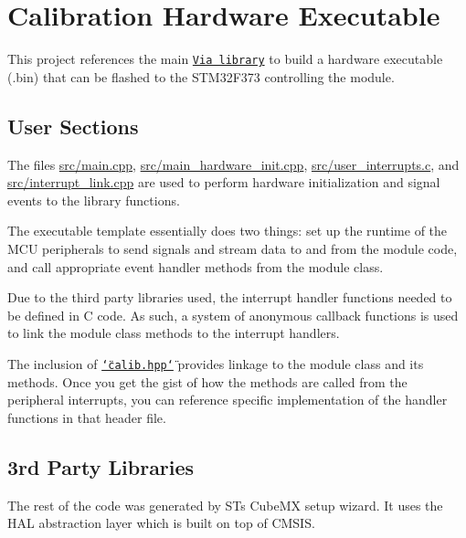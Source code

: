 \hypertarget{index_via_sec}{}\section{Calibration Hardware Executable}\label{index_via_sec}
This project references the main \href{https://starling.space/website/static/img/via_library_documentation/index.html}{\tt Via library} to build a hardware executable (.bin) that can be flashed to the S\+T\+M32\+F373 controlling the module.\hypertarget{index_modules_sec}{}\subsection{User Sections}\label{index_modules_sec}
The files \mbox{\hyperlink{main_8cpp}{src/main.\+cpp}}, \mbox{\hyperlink{main__hardware__init_8cpp}{src/main\+\_\+hardware\+\_\+init.\+cpp}}, \mbox{\hyperlink{user__interrupts_8c}{src/user\+\_\+interrupts.\+c}}, and \mbox{\hyperlink{interrupt__link_8cpp}{src/interrupt\+\_\+link.\+cpp}} are used to perform hardware initialization and signal events to the library functions.

The executable template essentially does two things\+: set up the runtime of the M\+CU peripherals to send signals and stream data to and from the module code, and call appropriate event handler methods from the module class.

Due to the third party libraries used, the interrupt handler functions needed to be defined in C code. As such, a system of anonymous callback functions is used to link the module class methods to the interrupt handlers.

The inclusion of \href{https://starling.space/website/static/img/via_library_documentation/class_via_calib.html}{\tt \char`\"{}calib.\+hpp\char`\"{}} provides linkage to the module class and its methods. Once you get the gist of how the methods are called from the peripheral interrupts, you can reference specific implementation of the handler functions in that header file.\hypertarget{index_synthesis_sec}{}\subsection{3rd Party Libraries}\label{index_synthesis_sec}
The rest of the code was generated by ST\textquotesingle{}s Cube\+MX setup wizard. It uses the H\+AL abstraction layer which is built on top of C\+M\+S\+IS. 